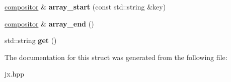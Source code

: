 \begin{DoxyCompactItemize}
\item 
\mbox{\label{structmods_1_1jx_1_1compositor_ae00f2e0be334cc6f8f9b9f107aa866d2}} 
\hyperlink{structmods_1_1jx_1_1compositor}{compositor} \& {\bfseries array\+\_\+start} (const std\+::string \&key)
\item 
\mbox{\label{structmods_1_1jx_1_1compositor_aa4938fa1753fb12e952d5135b9ffb68c}} 
\hyperlink{structmods_1_1jx_1_1compositor}{compositor} \& {\bfseries array\+\_\+end} ()
\item 
\mbox{\label{structmods_1_1jx_1_1compositor_ad8c74e836ece8023991551d8ce8539c7}} 
std\+::string {\bfseries get} ()
\end{DoxyCompactItemize}


The documentation for this struct was generated from the following file\+:\begin{DoxyCompactItemize}
\item 
jx.\+hpp\end{DoxyCompactItemize}
